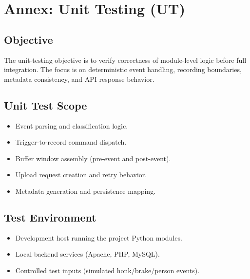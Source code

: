 \chapter{Annex: Unit Testing (UT)}
\section{Objective}
The unit-testing objective is to verify correctness of module-level logic before full integration. The focus is on deterministic event handling, recording boundaries, metadata consistency, and API response behavior.

\section{Unit Test Scope}
\begin{itemize}
\item Event parsing and classification logic.
\item Trigger-to-record command dispatch.
\item Buffer window assembly (pre-event and post-event).
\item Upload request creation and retry behavior.
\item Metadata generation and persistence mapping.
\end{itemize}

\section{Test Environment}
\begin{itemize}
\item Development host running the project Python modules.
\item Local backend services (Apache, PHP, MySQL).
\item Controlled test inputs (simulated honk/brake/person events).
\end{itemize}

